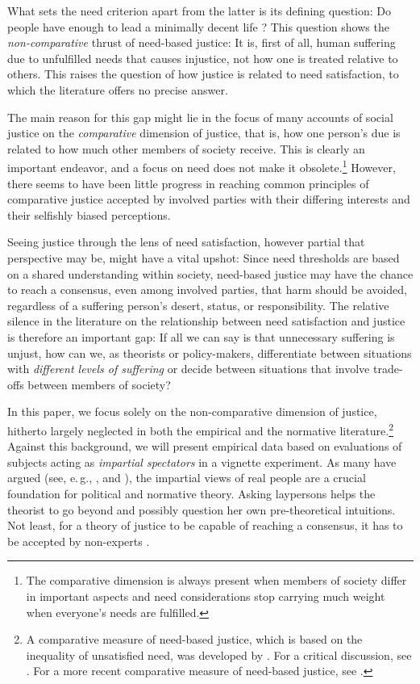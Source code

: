 \documentclass[12pt]{scrartcl}
\begin{document}
What sets the need criterion apart from the latter is its defining question: Do people have enough \citep{frankfurt_inequality_2015} to lead a minimally decent life \citep{miller_principles_1999}?
This question shows the \textit{non-comparative} \citep{feinberg_noncomparative_1974} thrust of need-based justice: It is, first of all, human suffering due to unfulfilled needs that causes injustice, not how one is treated relative to others.
This raises the question of how justice is related to need satisfaction, to which the literature offers no precise answer.

The main reason for this gap might lie in the focus of many accounts of social justice on the \textit{comparative} dimension of justice, that is, how one person's due is related to how much other members of society receive.
This is clearly an important endeavor, and a focus on need does not make it obsolete.\footnote{The comparative dimension is always present when members of society differ in important aspects and need considerations stop carrying much weight when everyone's needs are fulfilled.}
However, there seems to have been little progress in reaching common principles of comparative justice accepted by involved parties with their differing interests and their selfishly biased perceptions.

Seeing justice through the lens of need satisfaction, however partial that perspective may be, might have a vital upshot: Since need thresholds are based on a shared understanding within society, need-based justice may have the chance to reach a consensus, even among involved parties, that harm should be avoided, regardless of a suffering person's desert, status, or responsibility.
The relative silence in the literature on the relationship between need satisfaction and justice is therefore an important gap: If all we can say is that unnecessary suffering is unjust, how can we, as theorists or policy-makers, differentiate between situations with \textit{different levels of suffering} or decide between situations that involve trade-offs between members of society?

In this paper, we focus solely on the non-comparative dimension of justice, hitherto largely neglected in both the empirical and the normative literature.\footnote{A comparative measure of need-based justice, which is based on the inequality of unsatisfied need, was developed by \citet{miller_principles_1999}. For a critical discussion, see \citet{siebel_need_2020}. For a more recent comparative measure of need-based justice, see \citet{springhorn_measurement_2022}.}
Against this background, we will present empirical data based on evaluations of subjects acting as \textit{impartial spectators} in a vignette experiment.
As many have argued (see, e.\,g., \citealp{konow_which_2003}, and \citealp{miller_distributive_2017}), the impartial views of real people are a crucial foundation for political and normative theory.
Asking laypersons helps the theorist to go beyond and possibly question her own pre-theoretical intuitions.
Not least, for a theory of justice to be capable of reaching a consensus, it has to be accepted by non-experts \citep[also see][]{de_vries_empirical_2009,bauer_empirical_2020}.
\end{document}
